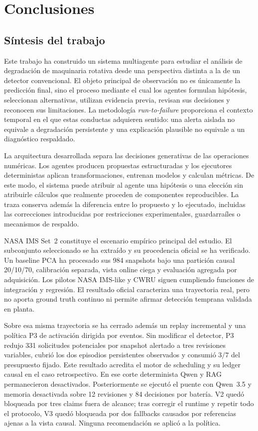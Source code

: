 \chapter{Conclusiones}

\section{Síntesis del trabajo}

Este trabajo ha construido un sistema multiagente para estudiar el análisis de
degradación de maquinaria rotativa desde una perspectiva distinta a la de un
detector convencional. El objeto principal de observación no es únicamente la
predicción final, sino el proceso mediante el cual los agentes formulan
hipótesis, seleccionan alternativas, utilizan evidencia previa, revisan sus
decisiones y reconocen sus limitaciones. La metodología
\textit{run-to-failure} proporciona el contexto temporal en el que estas
conductas adquieren sentido: una alerta aislada no equivale a degradación
persistente y una explicación plausible no equivale a un diagnóstico
respaldado.

La arquitectura desarrollada separa las decisiones generativas de las
operaciones numéricas. Los agentes producen propuestas estructuradas y los
ejecutores deterministas aplican transformaciones, entrenan modelos y calculan
métricas. De este modo, el sistema puede atribuir al agente una hipótesis o una
elección sin atribuirle cálculos que realmente proceden de componentes
reproducibles. La traza conserva además la diferencia entre lo propuesto y lo
ejecutado, incluidas las correcciones introducidas por restricciones
experimentales, guardarraíles o mecanismos de respaldo.

NASA IMS Set~2 constituye el escenario empírico principal del estudio. El
subconjunto seleccionado se ha extraído y su procedencia oficial se ha
verificado. Un baseline PCA ha procesado sus 984 snapshots bajo una partición
causal 20/10/70, calibración separada, vista online ciega y evaluación agregada
por adquisición. Los pilotos NASA IMS-like y CWRU siguen cumpliendo funciones de
integración y regresión. El resultado oficial caracteriza una trayectoria real,
pero no aporta ground truth continuo ni permite afirmar detección temprana
validada en planta.

Sobre esa misma trayectoria se ha cerrado además un replay incremental y una
política P3 de activación dirigida por eventos. Sin modificar el detector, P3
redujo 331 solicitudes potenciales por snapshot alertado a tres revisiones
variables, cubrió los dos episodios persistentes observados y consumió $3/7$
del presupuesto fijado. Este resultado acredita el motor de scheduling y su
ledger causal en el caso retrospectivo. En ese corte determinista Qwen y RAG
permanecieron desactivados. Posteriormente se ejecutó el puente con Qwen~3.5 y
memoria desactivada sobre 12 revisiones y 84 decisiones por batería. V2 quedó
bloqueada por tres claims fuera de alcance; tras corregir el runtime y repetir
todo el protocolo, V3 quedó bloqueada por dos fallbacks causados por referencias
ajenas a la vista causal. Ninguna recomendación se aplicó a la política.

